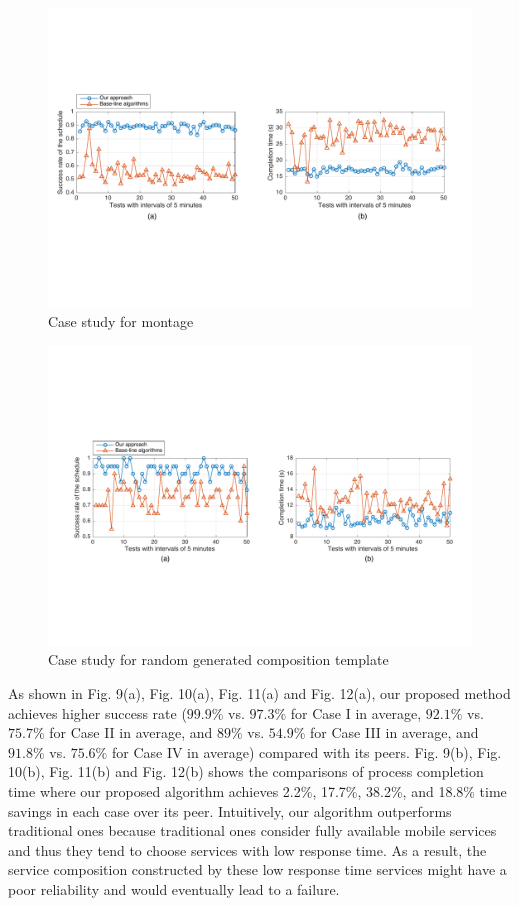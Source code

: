\documentclass[journal]{IEEEtran}
\begin{document}
\begin{figure}[!t]
\centering
\includegraphics[width=6.6in]{./img/Task-24.pdf}
\caption{Case study for montage}
\label{Task-24}
\end{figure}
\begin{figure}[!t]
\centering
\includegraphics[width=6.6in]{./img/Task-12-random.pdf}
\caption{Case study for random generated composition template}
\label{Task-random}
\end{figure}

As shown in Fig. 9(a), Fig. 10(a), Fig. 11(a) and Fig. 12(a), our proposed method achieves higher success rate ($99.9\%$ vs. $97.3\%$ for Case I in average, $92.1\%$ vs. $75.7\%$ for Case II in average, and $89\%$ vs. $54.9\%$ for Case III in average, and $91.8\%$ vs. $75.6\%$ for Case IV in average) compared with its peers.
Fig. 9(b), Fig. 10(b), Fig. 11(b) and Fig. 12(b) shows the comparisons of process completion time where our proposed algorithm achieves 2.2\%, 17.7\%, 38.2\%, and 18.8\% time savings in each case over its peer. 
Intuitively, our algorithm outperforms traditional ones because traditional ones consider fully available mobile services and thus they tend to choose services with low response time. As a result, the service composition constructed by these low response time services might have a poor reliability and would eventually lead to a failure.
\end{document}
